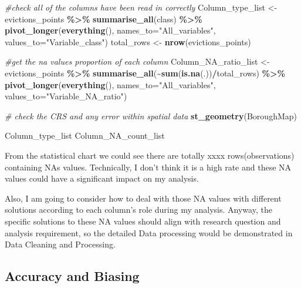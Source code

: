 \documentclass[
]{article}
\newenvironment{Shaded}{\begin{snugshade}}{\end{snugshade}}
\newcommand{\AttributeTok}[1]{\textcolor[rgb]{0.13,0.29,0.53}{#1}}
\newcommand{\CommentTok}[1]{\textcolor[rgb]{0.56,0.35,0.01}{\textit{#1}}}
\newcommand{\FunctionTok}[1]{\textcolor[rgb]{0.13,0.29,0.53}{\textbf{#1}}}
\newcommand{\NormalTok}[1]{#1}
\newcommand{\OtherTok}[1]{\textcolor[rgb]{0.56,0.35,0.01}{#1}}
\newcommand{\SpecialCharTok}[1]{\textcolor[rgb]{0.81,0.36,0.00}{\textbf{#1}}}
\newcommand{\StringTok}[1]{\textcolor[rgb]{0.31,0.60,0.02}{#1}}
\begin{document}
\begin{Shaded}
\begin{Highlighting}[]
\CommentTok{\#check all of the columns have been read in correctly}
\NormalTok{Column\_type\_list }\OtherTok{\textless{}{-}}\NormalTok{ evictions\_points }\SpecialCharTok{\%\textgreater{}\%} 
  \FunctionTok{summarise\_all}\NormalTok{(class) }\SpecialCharTok{\%\textgreater{}\%}
  \FunctionTok{pivot\_longer}\NormalTok{(}\FunctionTok{everything}\NormalTok{(), }
               \AttributeTok{names\_to=}\StringTok{"All\_variables"}\NormalTok{, }
               \AttributeTok{values\_to=}\StringTok{"Variable\_class"}\NormalTok{)}
\NormalTok{total\_rows }\OtherTok{\textless{}{-}} \FunctionTok{nrow}\NormalTok{(evictions\_points)}

\CommentTok{\#get the na values proportion of each column}
\NormalTok{Column\_NA\_ratio\_list }\OtherTok{\textless{}{-}}\NormalTok{ evictions\_points }\SpecialCharTok{\%\textgreater{}\%} 
  \FunctionTok{summarise\_all}\NormalTok{(}\SpecialCharTok{\textasciitilde{}}\FunctionTok{sum}\NormalTok{(}\FunctionTok{is.na}\NormalTok{(.))}\SpecialCharTok{/}\NormalTok{total\_rows) }\SpecialCharTok{\%\textgreater{}\%}
  \FunctionTok{pivot\_longer}\NormalTok{(}\FunctionTok{everything}\NormalTok{(), }
               \AttributeTok{names\_to=}\StringTok{"All\_variables"}\NormalTok{, }
               \AttributeTok{values\_to=}\StringTok{"Variable\_NA\_ratio"}\NormalTok{)}

\CommentTok{\# check the CRS and any error within spatial data}
\FunctionTok{st\_geometry}\NormalTok{(BoroughMap)}

\NormalTok{Column\_type\_list}
\NormalTok{Column\_NA\_count\_list}
\end{Highlighting}
\end{Shaded}

From the statistical chart we could see there are totally xxxx
rows(observations) containing NAs values. Technically, I don't think it
is a high rate and these NA values could have a significant impact on my
analysis.

Also, I am going to consider how to deal with those NA values with
different solutions according to each column's role during my analysis.
Anyway, the specific solutions to these NA values should align with
research question and analysis requirement, so the detailed Data
processing would be demonstrated in Data Cleaning and Processing.

\hypertarget{accuracy-and-biasing}{%
\subsection{Accuracy and Biasing}\label{accuracy-and-biasing}}
\end{document}
